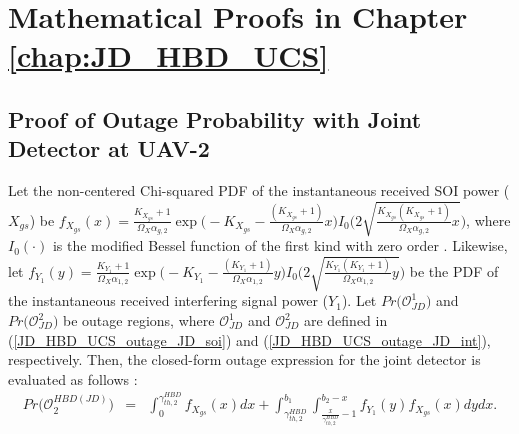 \chapter{Mathematical Proofs in Chapter \ref{chap:JD_HBD_UCS}}
\label{chap:Appendix_B}
\section{Proof of Outage Probability with Joint Detector at UAV-2} \label{JD_HBD_UCS_JD_proof}

Let the non-centered Chi-squared PDF of the instantaneous received SOI power ($X_{gs}$) be $f_{X_{gs}}(x) = \frac{K_{X_{gs}}+1}{\Omega_{X}\alpha_{g,2}} \exp\bigg(-K_{X_{gs}}-\frac{(K_{X_{gs}} + 1)}{\Omega_{X}\alpha_{g,2}}x\bigg)I_{0}\bigg(2\sqrt{\frac{K_{X_{gs}}(K_{X_{gs}}+1)}{\Omega_{X}\alpha_{g,2}}x}\bigg)$, where $I_{0}\left(\cdot\right)$ is the modified Bessel function of the first kind with zero order \cite{gradshteyn2014table}. Likewise, let $f_{Y_1}(y) = \frac{K_{Y_1}+1}{\Omega_{X}\alpha_{1,2}}\exp\bigg(-K_{Y_1}-\frac{(K_{Y_1} + 1)}{\Omega_{X}\alpha_{1,2}}y\bigg) I_{0}\bigg(2\sqrt{\frac{K_{Y_1}(K_{Y_1}+1)}{\Omega_{X}\alpha_{1,2}}y}\bigg)$ be the PDF of the instantaneous received interfering signal power ($Y_1$). Let $Pr\big( \mathcal{O}_{JD}^{1} \big)$ and $Pr\big( \mathcal{O}_{JD}^{2} \big)$ be outage regions, where $\mathcal{O}_{JD}^{1}$ and $\mathcal{O}_{JD}^{2}$ are defined in (\ref{JD_HBD_UCS_outage_JD_soi}) and (\ref{JD_HBD_UCS_outage_JD_int}), respectively. Then, the closed-form outage expression for the joint detector is evaluated as follows \cite[eq. (17)]{narasimhan2007individual}:
\begin{eqnarray}
Pr\big(\mathcal{O}_{2}^{HBD(JD)}\big) & = & \int_{0}^{\gamma_{th,2}^{HBD}} f_{X_{gs}}(x) dx + \int_{\gamma_{th,2}^{HBD}}^{b_1} \int_{\frac{x}{\gamma_{th,2}^{HBD}}-1}^{b_2 - x} f_{Y_1}(y) f_{X_{gs}}(x) dydx. \label{JD_HBD_UCS_appdx_JD_1} 
\end{eqnarray}

